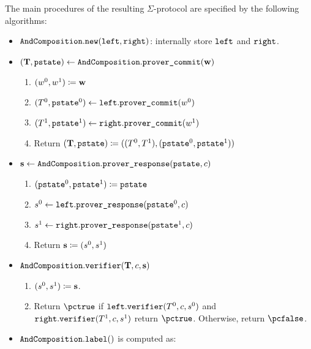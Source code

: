 \documentclass[11pt]{article}
\begin{document}
The main procedures of the resulting $\Sigma$-protocol are specified by the following algorithms:
\begin{itemize}
  \item
  $\texttt{AndComposition}.\texttt{new}(\texttt{left}, \texttt{right})$: internally store $\texttt{left}$ and $\texttt{right}$.
  \item
  $(\mathbf {T}, \texttt{pstate})\gets \texttt{AndComposition}.\texttt{prover\_commit}(\mathbf {w})$
    \begin{enumerate}
      \item
        $(w^0,w^1)\coloneqq \mathbf {w}$
      \item
        $(T^0,\texttt{pstate}^0)\gets\texttt{left}.\texttt{prover\_commit}(w^0)$
      \item $(T^1,\texttt{pstate}^1)\gets\texttt{right}.\texttt{prover\_commit}(w^1)$
      \item
	Return $(\mathbf {T},\texttt{pstate}) \coloneqq ((T^0,  T^1),(\texttt{pstate}^0,\texttt{pstate}^1))$
    \end{enumerate}
  \item
  $\mathbf {s} \gets \texttt{AndComposition}.\texttt{prover\_response}(\texttt{pstate}, c)$
  \begin{enumerate}
      \item
	    $(\texttt{pstate}^0,\texttt{pstate}^1)\coloneqq \texttt{pstate}$
      \item
      $s^0\gets\texttt{left}.\texttt{prover\_response}(\texttt{pstate}^0, c)$
      \item
      $s^1\gets\texttt{right}.\texttt{prover\_response}(\texttt{pstate}^1, c)$
      \item
      Return $\mathbf {s}\coloneqq(s^0,s^1)$
    \end{enumerate}
  \item
  $\texttt{AndComposition}.\texttt{verifier}(\mathbf {T}, c, \mathbf {s})$
  \begin{enumerate}
      \item
        $(s^0,s^1)\coloneqq \mathbf {s}$.
      \item
	Return $\accept$ if $\texttt{left}.\texttt{verifier}(T^0,c, s^0)$ and $\texttt{right}.\texttt{verifier}(T^1,c, s^1)$ return $\accept$. Otherwise, return $\reject$.
    \end{enumerate}
  \item  $\texttt{AndComposition}.\texttt{label}()$ is computed as:

\end{itemize}
\end{document}

